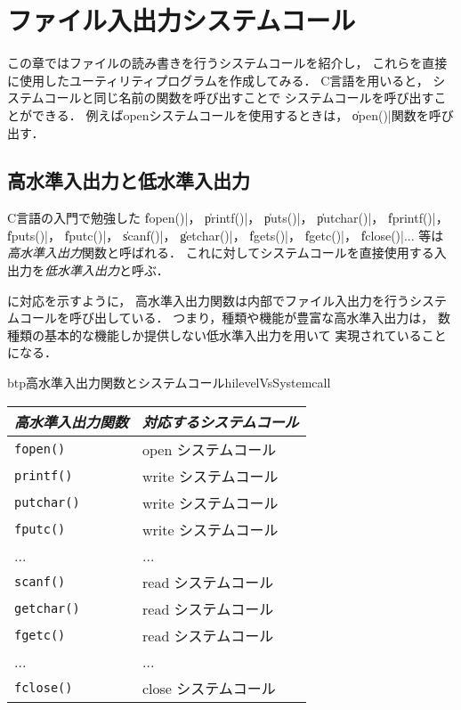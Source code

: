 \chapter{ファイル入出力システムコール}

この章ではファイルの読み書きを行うシステムコールを紹介し，
これらを直接に使用したユーティリティプログラムを作成してみる．
C言語を用いると，
システムコールと同じ名前の関数を呼び出すことで
システムコールを呼び出すことができる．
例えばopenシステムコールを使用するときは，
\|open()|関数を呼び出す．

\section{高水準入出力と低水準入出力}
C言語の入門で勉強した
\|fopen()|，
\|printf()|，
\|puts()|，
\|putchar()|，
\|fprintf()|，
\|fputs()|，
\|fputc()|，
\|scanf()|，
\|getchar()|，
\|fgets()|，
\|fgetc()|，
\|fclose()|...
等は\emph{高水準入出力}関数と呼ばれる．
これに対してシステムコールを直接使用する入出力を\emph{低水準入出力}と呼ぶ．

に対応を示すように，
高水準入出力関数は内部でファイル入出力を行うシステムコールを呼び出している．
つまり，種類や機能が豊富な高水準入出力は，
数種類の基本的な機能しか提供しない低水準入出力を用いて
実現されていることになる．


\begin{mytable}{btp}{高水準入出力関数とシステムコール}{hilevelVsSystemcall}
\begin{tabular}{l | l}\hline\hline
\emph{高水準入出力関数} & \emph{対応するシステムコール} \\\hline
\texttt{fopen()}      & open システムコール \\
\texttt{printf()}     & write システムコール \\
\texttt{putchar()}    & write システムコール \\
\texttt{fputc()}      & write システムコール \\
...          & ...                     \\
\texttt{scanf()}      & read システムコール \\
\texttt{getchar()}    & read システムコール \\
\texttt{fgetc()}      & read システムコール \\
...          & ...                      \\
\texttt{fclose()}     & close システムコール \\
\end{tabular}
\end{mytable}

